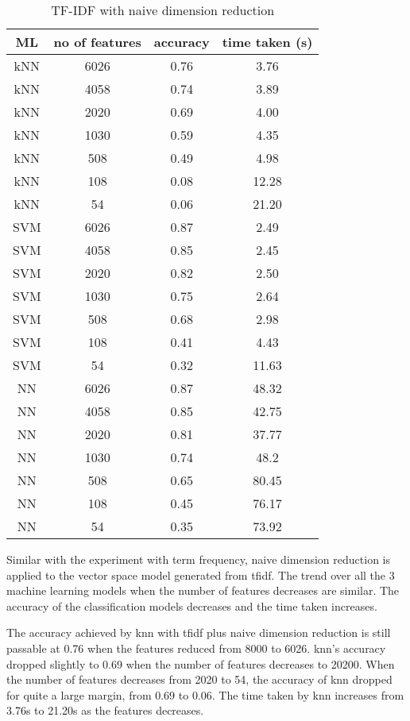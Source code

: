 \begin{table} [ht]
	\centering
	\caption{TF-IDF with naive dimension reduction}
	\label{tbl:tfidfNaive}
	\begin{tabular}{|| c | c | c | c||}
		\hline
		ML & no of features & accuracy & time taken (s) \\ [0.5ex]
		\hline\hline
		kNN & 6026 & 0.76 & 3.76 \\ 
		\hline
		kNN & 4058 & 0.74 & 3.89 \\ 
		\hline
		kNN & 2020 & 0.69 & 4.00 \\ 
		\hline
		kNN & 1030 & 0.59 & 4.35 \\ 
		\hline
		kNN & 508 & 0.49 & 4.98 \\ 
		\hline
		kNN & 108 & 0.08 & 12.28 \\ 
		\hline
		kNN & 54 & 0.06 & 21.20 \\ 
		\hline\hline
		SVM & 6026 & 0.87 & 2.49 \\
		\hline
		SVM & 4058 & 0.85 & 2.45 \\
		\hline
		SVM & 2020 & 0.82 & 2.50 \\
		\hline
		SVM & 1030 & 0.75 & 2.64 \\
		\hline
		SVM & 508 & 0.68 & 2.98 \\
		\hline
		SVM & 108 & 0.41 & 4.43 \\
		\hline
		SVM & 54 & 0.32 & 11.63 \\
		\hline\hline
		NN & 6026 & 0.87 & 48.32 \\
		\hline
		NN & 4058 & 0.85 & 42.75 \\
		\hline
		NN & 2020 & 0.81 & 37.77 \\
		\hline
		NN & 1030 & 0.74 & 48.2 \\
		\hline
		NN & 508 & 0.65 & 80.45 \\
		\hline
		NN & 108 & 0.45 & 76.17 \\
		\hline
		NN & 54 & 0.35 & 73.92 \\
		\hline
	\end{tabular}
\end{table}

Similar with the experiment with term frequency, naive dimension reduction is applied to the vector space model generated from \ac{tfidf}. The trend over all the 3 machine learning models when the number of features decreases are similar. The accuracy of the classification models decreases and the time taken increases. 

The accuracy achieved by \ac{knn} with \ac{tfidf} plus naive dimension reduction is still passable at 0.76 when the features reduced from 8000 to 6026. \Ac{knn}'s accuracy dropped slightly to 0.69 when the number of features decreases to 20200. When the number of features decreases from 2020 to 54, the accuracy of \ac{knn} dropped for quite a large margin, from 0.69 to 0.06. The time taken by \ac{knn} increases from 3.76s to 21.20s as the features decreases.

